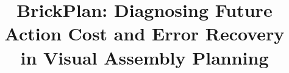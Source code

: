 \documentclass[10pt,twocolumn,letterpaper]{article}
\title{BrickPlan: Diagnosing Future Action Cost and Error Recovery\\in Visual Assembly Planning}
\begin{document}
\raggedbottom
\maketitlesupplementary
\appendix

\end{document}
